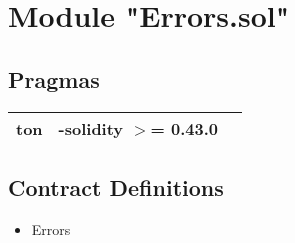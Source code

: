 
\section{Module "Errors.sol"}


\subsection{Pragmas}


\noindent\begin{tabular}{|l|l|p{5cm}|}\hline
ton & -solidity $>$= 0.43.0 &\\\hline
\end{tabular}


\subsection{Contract Definitions}

\begin{itemize}
\item Errors
\end{itemize}
